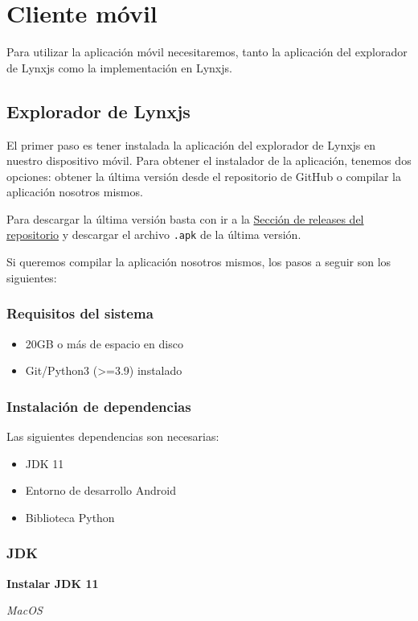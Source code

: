 \section{Cliente móvil}
Para utilizar la aplicación móvil necesitaremos, tanto la aplicación del explorador de Lynxjs como la implementación en Lynxjs.
\subsection{Explorador de Lynxjs}
El primer paso es tener instalada la aplicación del explorador de Lynxjs en nuestro dispositivo móvil.
Para obtener el instalador de la aplicación, tenemos dos opciones: obtener la última versión desde el repositorio de GitHub o compilar la aplicación nosotros mismos.

Para descargar la última versión basta con ir a la \href{https://github.com/alexrp-tfg/lynx-tfg/releases}{Sección de releases del repositorio} y descargar el archivo \texttt{.apk} de la última versión.

Si queremos compilar la aplicación nosotros mismos, los pasos a seguir son los siguientes:

\subsubsection{Requisitos del sistema}
\begin{itemize}
    \item 20GB o más de espacio en disco
    \item Git/Python3 (>=3.9) instalado
\end{itemize}

\subsubsection{Instalación de dependencias}
Las siguientes dependencias son necesarias:
\begin{itemize}
    \item JDK 11
    \item Entorno de desarrollo Android
    \item Biblioteca Python
\end{itemize}

\subsubsection{JDK}
\textbf{Instalar JDK 11}

\textit{MacOS}

